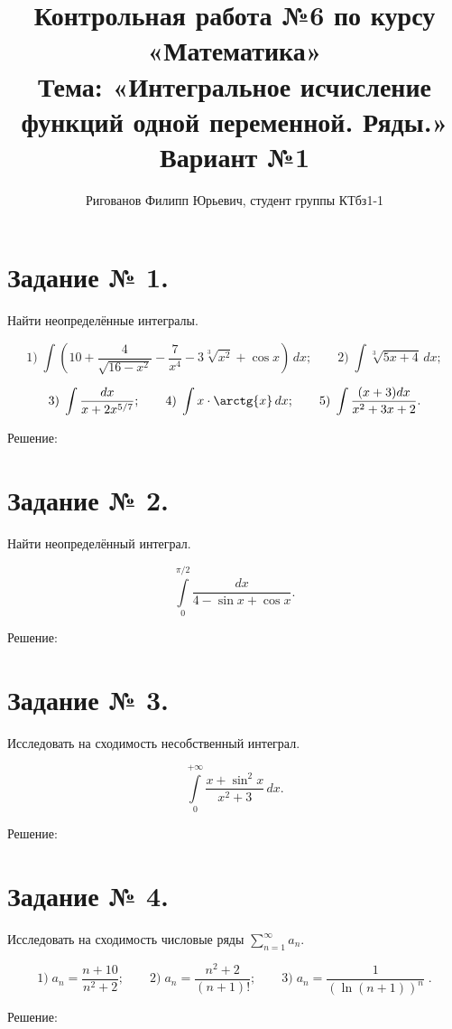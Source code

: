 \documentclass{article}
\title{Контрольная работа №6 по курсу «Математика»\\
Тема: «Интегральное исчисление функций одной переменной. Ряды.»\\
Вариант №1}
\author{Ригованов Филипп Юрьевич, студент группы КТбз1-1}
\begin{document}
\date{}
\maketitle
\section*{Задание № 1.}

Найти неопределённые интегралы.

$$1)\;\int\left(10+\frac{4}{\sqrt{16-x^2}}-\frac{7}{x^4}-3\sqrt[3]{x^2}+\cos{x}\right)\,dx;\qquad2)\;\int\sqrt[3]{5x+4}\,dx;$$

$$3)\;\int\frac{dx}{x+2x^{5/7}};\qquad4)\;\int x\cdot\arctg{x}\,dx;\qquad5)\;\int\frac{(x+3)dx}{x^2+3x+2}.$$

\begin{center}Решение:\end{center}

\section*{Задание № 2.}

Найти неопределённый интеграл.

$$\int\limits_{0}^{\pi/2}\frac{dx}{4-\sin{x}+\cos{x}}.$$

\begin{center}Решение:\end{center}

\section*{Задание № 3.}

Исследовать на сходимость несобственный интеграл.

$$\int\limits_{0}^{+\infty}\frac{x+\sin^2{x}}{x^2+3}\,dx.$$

\begin{center}Решение:\end{center}

\section*{Задание № 4.}

Исследовать на сходимость числовые ряды $\sum\limits_{n=1}^{\infty}a_n$.

$$1)\;a_n=\frac{n+10}{n^2+2};\qquad2)\;a_n=\frac{n^2+2}{(n+1)!};\qquad3)\;a_n=\frac{1}{(\ln{(n+1)})^n}\;.$$

\begin{center}Решение:\end{center}
\end{document}
